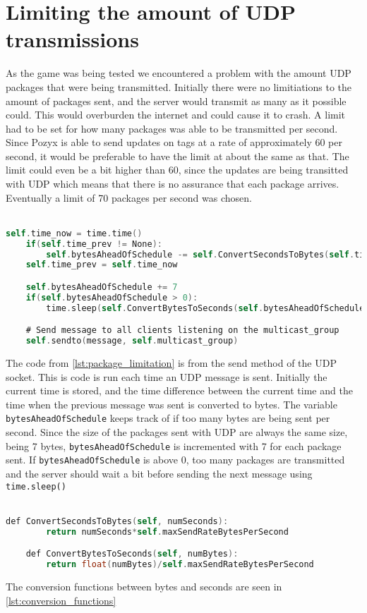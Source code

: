 \section{Limiting the amount of UDP transmissions}
As the game was being tested we encountered a problem with the amount UDP packages that were being transmitted.
Initially there were no limitiations to the amount of packages sent, and the server would transmit as many as it possible could.
This would overburden the internet and could cause it to crash.
A limit had to be set for how many packages was able to be transmitted per second.
Since Pozyx is able to send updates on tags at a rate of approximately 60 per second, it would be preferable to have the limit at about the same as that.
The limit could even be a bit higher than 60, since the updates are being transitted with UDP which means that there is no assurance that each package arrives.
Eventually a limit of 70 packages per second was chosen.
\\\\
\begin{lstlisting}[caption={Implementaion of the limit on the amount of packages that can be sent per second}, captionpos=b,language=C,label={lst:package_limitation}]
    self.time_now = time.time()
    if(self.time_prev != None):
        self.bytesAheadOfSchedule -= self.ConvertSecondsToBytes(self.time_now - self.time_prev)
    self.time_prev = self.time_now

    self.bytesAheadOfSchedule += 7
    if(self.bytesAheadOfSchedule > 0):
        time.sleep(self.ConvertBytesToSeconds(self.bytesAheadOfSchedule))

    # Send message to all clients listening on the multicast_group
    self.sendto(message, self.multicast_group)
\end{lstlisting}
The code from \autoref{lst:package_limitation} is from the send method of the UDP socket.
This is code is run each time an UDP message is sent.
Initially the current time is stored, and the time difference between the current time and the time when the previous message was sent is converted to bytes.
The variable \texttt{bytesAheadOfSchedule} keeps track of if too many bytes are being sent per second.
Since the size of the packages sent with UDP are always the same size, being 7 bytes, \texttt{bytesAheadOfSchedule} is incremented with 7 for each package sent.
If \texttt{bytesAheadOfSchedule} is above 0, too many packages are transmitted and the server should wait a bit before sending the next message using \texttt{time.sleep()}
\\\\
\begin{lstlisting}[caption={function for converting seconds to bytes and bytes to seconds}, captionpos=b,language=C,label={lst:conversion_functions}]
    def ConvertSecondsToBytes(self, numSeconds):
        return numSeconds*self.maxSendRateBytesPerSecond

    def ConvertBytesToSeconds(self, numBytes):
        return float(numBytes)/self.maxSendRateBytesPerSecond
\end{lstlisting}
The conversion functions between bytes and seconds are seen in \autoref{lst:conversion_functions}
